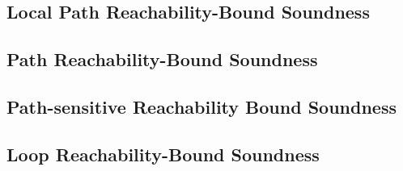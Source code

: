 \subsection{Local Path Reachability-Bound Soundness}
\label{apdx:pathlocalrb-sound}

\clearpage

\subsection{Path Reachability-Bound Soundness}
\label{apdx:pathrb-sound}

\clearpage

\subsection{Path-sensitive Reachability Bound Soundness}
\label{apdx:psrb-sound}

\clearpage

\subsection{Loop Reachability-Bound Soundness}
\label{apdx:looprb-sound}

\clearpage

